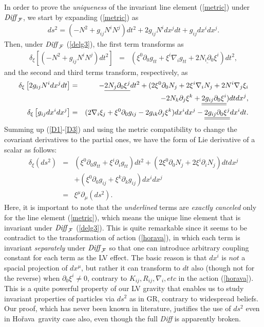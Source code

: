 \documentclass[preprint,aps,tightenlines,showkeys,nofootinbib,superscriptaddress]{revtex4}
\newcommand{\beq}{\begin{eqnarray}}
\newcommand{\eeq}{\end{eqnarray}}
\newcommand{\no}{{\nonumber}}
\newcommand{\Ho}{Ho\v{r}ava}
\newcommand{\diff}{diffeomorphism}
\begin{document}
In
order to prove the {\it uniqueness} of the invariant line element (\ref{metric}) under
${\it Diff}_{\cal F}$, we start by expanding (\ref{metric}) as
\beq
ds^{2}=(-N^{2}+g_{ij}N^{i}N^{j})dt^{2}+2 g_{ij}N^{i}dx^{j}dt+g_{ij}dx^{i}dx^{j}.
\eeq
Then, under ${\it Diff}_{\cal F}$ (\ref{delg3}), the first term transforms as
\beq
\delta_{\xi}\left[ (-N^{2}+g_{ij}N^{i}N^{j})dt^{2}\right]&=&(\xi^{0}\partial_{0}g_{tt}+\xi^{i}
\nabla_i g_{tt}+\underline{2N_{i}\partial_{0}\xi^{i}})dt^{2},\label{D1}
\eeq
and the second and third terms transform, respectively, as
\beq
\delta_{\xi} \left[2 g_{ij}N^{i}dx^{j}dt\right]&=& -\underline{2N_{j}\partial_0\xi^{j}}dt^{2}+(2\xi^{0}\partial_0N_{j}+2\xi^{i}\nabla_{i}N_{j}
+2N^{i}\nabla_{j}\xi_{i} \no \\
&&-2N_{k}\partial_{j}\xi^{k}+\underline{\underline{2g_{ij}\partial_0\xi^{i}}})dtdx^{j},\label{D2}\\
\delta_{\xi} \left[g_{ij}dx^{i}dx^{j}\right]&=&(2\nabla_{i}\xi_{j}+\xi^{0}\partial_0g_{ij}
-2g_{ik}\partial_{j}\xi^{k})dx^{i}dx^{j}-\underline{\underline{2g_{ij}\partial_0\xi^{j}}}dx^{i}dt.\label{D3}
\eeq
Summing up (\ref{D1}-\ref{D3}) and using the metric compatibility to change the covariant derivatives to the partial ones,
we have the form of Lie derivative of a scalar as follows:
\beq
\delta_{\xi}(ds^{2})&=&(\xi^{0}\partial_0g_{tt}+\xi^{i}\partial_{i}g_{tt})dt^{2}
+(2\xi^{0}\partial_0N_{j}+2\xi^{i}\partial_{i}N_{j})dt dx^{j} \nonumber\\
&&+(\xi^{0}\partial_0g_{ij}+\xi^{k}\partial_{k}g_{ij})dx^{i}dx^{j}\\
&=&{}\xi^{\mu} \partial_{\mu} (ds^{2}).
\eeq
Here, it is important to note that the {\it underlined} terms are
{\it exactly canceled} only for the line element (\ref{metric}), which means
the unique line element that is invariant under ${\it Diff}_{\cal F}$ (\ref{delg3}).
This is quite remarkable since it seems to be contradict to the transformation
of action (\ref{horava}), in which each term is invariant {\it separately}
under ${\it Diff}_{\cal F}$ so that one can introduce arbitrary coupling
constant for each term as the LV
effect. The basic reason is that $dx^i$ is $not$ a spacial projection of $dx^{\mu}$, but rather it can transform to $dt$ also (though not for the reverse) when $\partial_0 \xi^i \neq 0$, contrary to $K_{ij}, R_{ij}, \nabla_i, etc$ in the action (\ref{horava}). This is a quite powerful property of our LV gravity that enables us to study invariant properties of particles via $ds^{2}$ as in GR, contrary to widespread beliefs. Our proof, which has never been known in literature, justifies the use of $ds^{2}$ even in \Ho~gravity case also, even though the full {\it Diff} is apparently broken.
\end{document}
